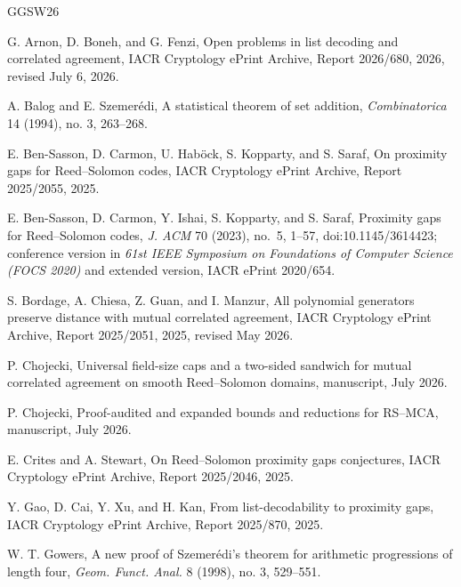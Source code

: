 \documentclass[12pt,a4paper]{amsart}
\numberwithin{equation}{section}
\theoremstyle{remark}
\begin{document}
\begin{thebibliography}{GGSW26}

G. Arnon, D. Boneh, and G. Fenzi,
\newblock Open problems in list decoding and correlated agreement,
\newblock IACR Cryptology ePrint Archive, Report 2026/680, 2026,
revised July 6, 2026.

A. Balog and E. Szemerédi,
\newblock A statistical theorem of set addition,
\newblock \emph{Combinatorica} 14 (1994), no. 3, 263--268.

E. Ben-Sasson, D. Carmon, U. Hab\"ock, S. Kopparty, and S. Saraf,
\newblock On proximity gaps for Reed--Solomon codes,
\newblock IACR Cryptology ePrint Archive, Report 2025/2055, 2025.

E. Ben-Sasson, D. Carmon, Y. Ishai, S. Kopparty, and S. Saraf,
\newblock Proximity gaps for Reed--Solomon codes,
\newblock \emph{J. ACM} 70 (2023), no.~5, 1--57,
\newblock doi:10.1145/3614423; conference version in
\emph{61st IEEE Symposium on Foundations of Computer Science
(FOCS 2020)} and extended version, IACR ePrint 2020/654.

S. Bordage, A. Chiesa, Z. Guan, and I. Manzur,
\newblock All polynomial generators preserve distance with mutual
correlated agreement,
\newblock IACR Cryptology ePrint Archive, Report 2025/2051, 2025,
revised May 2026.

P. Chojecki,
\newblock Universal field-size caps and a two-sided sandwich for mutual
correlated agreement on smooth Reed--Solomon domains,
\newblock manuscript, July 2026.

P. Chojecki,
\newblock Proof-audited and expanded bounds and reductions for RS--MCA,
\newblock manuscript, July 2026.

E. Crites and A. Stewart,
\newblock On Reed--Solomon proximity gaps conjectures,
\newblock IACR Cryptology ePrint Archive, Report 2025/2046, 2025.

Y. Gao, D. Cai, Y. Xu, and H. Kan,
\newblock From list-decodability to proximity gaps,
\newblock IACR Cryptology ePrint Archive, Report 2025/870, 2025.

W. T. Gowers,
\newblock A new proof of Szemerédi's theorem for arithmetic progressions of length four,
\newblock \emph{Geom. Funct. Anal.} 8 (1998), no. 3, 529--551.


\end{thebibliography}
\end{document}
